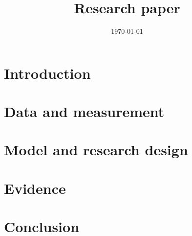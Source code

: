 \documentclass[11pt]{article}
\title{Research paper}
\author{} %
\date{\today}
\begin{document}
\maketitle
\begin{abstract}
\end{abstract}
\section{Introduction}\label{sec:introduction}
\section{Data and measurement}\label{sec:data}
\section{Model and research design}\label{sec:design}
\section{Evidence}\label{sec:evidence}
\section{Conclusion}\label{sec:conclusion}
\end{document}
